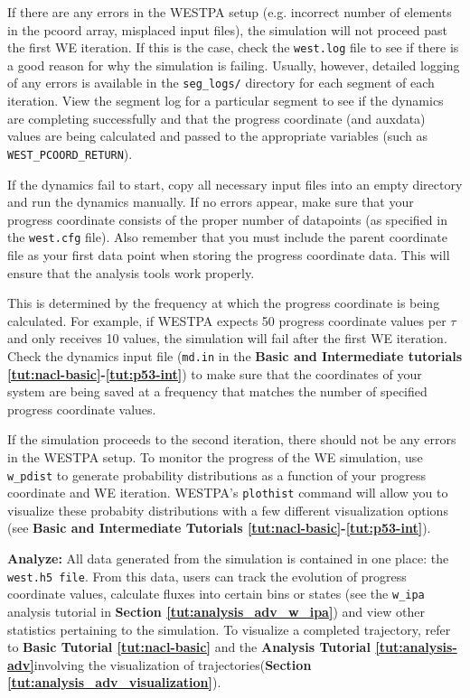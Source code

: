 If there are any errors in the WESTPA setup (e.g. incorrect number of elements in the pcoord array, misplaced input files), the simulation will not proceed past the first WE iteration. 
If this is the case, check the \verb|west.log| file to see if there is a good reason for why the simulation is failing. 
Usually, however, detailed logging of any errors is available in the \verb|seg_logs/| directory for each segment of each iteration. 
View the segment log for a particular segment to see if the dynamics are completing successfully and that the progress coordinate (and auxdata) values are being calculated and passed to the appropriate variables (such as \verb|WEST_PCOORD_RETURN|).

If the dynamics fail to start, copy all necessary input files into an empty directory and run the dynamics manually. 
If no errors appear, make sure that your progress coordinate consists of the proper number of datapoints (as specified in the \verb|west.cfg| file). Also remember that you must include the parent coordinate file as your first data point when storing the progress coordinate data. This will ensure that the analysis tools work properly.

This is determined by the frequency at which the progress coordinate is being calculated. 
For example, if WESTPA expects 50 progress coordinate values per $\tau$ and only receives 10 values, the simulation will fail after the first WE iteration. 
Check the dynamics input file (\verb|md.in| in the \textbf{Basic and Intermediate tutorials \ref{tut:nacl-basic}-\ref{tut:p53-int}}) to make sure that the coordinates of your system are being saved at a frequency that matches the number of specified progress coordinate values.

If the simulation proceeds to the second iteration, there should not be any errors in the WESTPA setup. 
To monitor the progress of the WE simulation, use \verb|w_pdist| to generate probability distributions as a function of your progress coordinate and WE iteration. 
WESTPA’s \verb|plothist| command will allow you to visualize these probabity distributions with a few different visualization options (see \textbf{Basic and Intermediate Tutorials \ref{tut:nacl-basic}-\ref{tut:p53-int}}).

\textbf{Analyze:} All data generated from the simulation is contained in one place: the \verb|west.h5 file|. 
From this data, users can track the evolution of progress coordinate values, calculate fluxes into certain bins or states (see the \verb|w_ipa| analysis tutorial in \textbf{Section \ref{tut:analysis_adv_w_ipa}}) and view other statistics pertaining to the simulation. 
To visualize a completed trajectory, refer to \textbf{Basic Tutorial \ref{tut:nacl-basic}} and the \textbf{Analysis Tutorial \ref{tut:analysis-adv}}involving the visualization of trajectories(\textbf{Section \ref{tut:analysis_adv_visualization}}).

